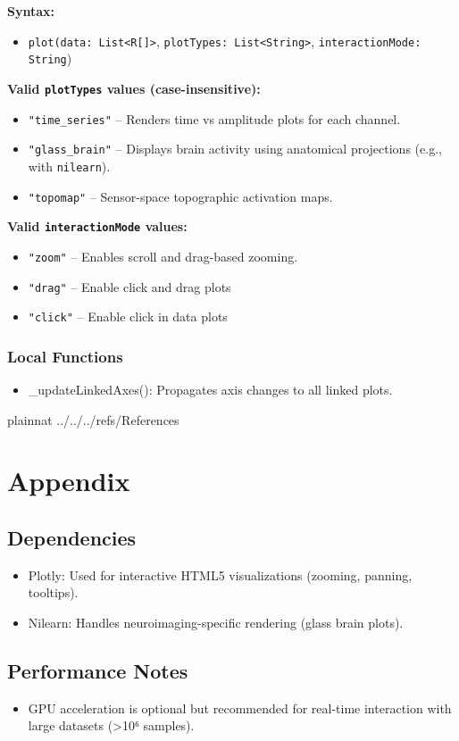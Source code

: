 \documentclass[12pt, titlepage]{article}
\begin{document}
\noindent\textbf{Syntax:}
\begin{itemize}
  \item \texttt{plot(data: List<R[]>}, \texttt{plotTypes: List<String>}, \texttt{interactionMode: String})
\end{itemize}

\noindent\textbf{Valid \texttt{plotTypes} values (case-insensitive):}
\begin{itemize}
  \item \texttt{"time\_series"} – Renders time vs amplitude plots for each channel.
  \item \texttt{"glass\_brain"} – Displays brain activity using anatomical projections (e.g., with \texttt{nilearn}).
  \item \texttt{"topomap"} – Sensor-space topographic activation maps.
\end{itemize}

\noindent\textbf{Valid \texttt{interactionMode} values:}
\begin{itemize}
  \item \texttt{"zoom"} – Enables scroll and drag-based zooming.
  \item \texttt{"drag"} – Enable click and drag plots
  \item \texttt{"click"} – Enable click in data plots
\end{itemize}





\subsubsection{Local Functions}

\begin{itemize}
\item \_updateLinkedAxes(): Propagates axis changes to all linked plots.


\end{itemize}

\newpage

 {plainnat}
 {../../../refs/References}

\newpage

\section{Appendix} \label{Appendix}

\subsection{ Dependencies}
\begin{itemize}
\item Plotly: Used for interactive HTML5 visualizations (zooming, panning, tooltips).


\item Nilearn: Handles neuroimaging-specific rendering (glass brain plots).


\end{itemize}
\subsection{Performance Notes}
\begin{itemize}
\item GPU acceleration is optional but recommended for real-time interaction with large datasets (>10⁶ samples).


\end{itemize}
\end{document}
